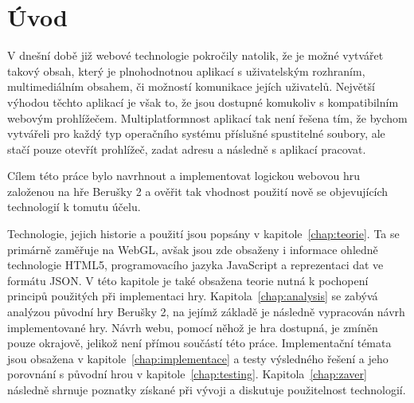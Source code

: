 \chapter{Úvod}
V dnešní době již webové technologie pokročily natolik, že je možné vytvářet takový obsah, který je plnohodnotnou aplikací s uživatelským rozhraním, multimediálním obsahem, či možností komunikace jejích uživatelů. Největší výhodou těchto aplikací je však to, že jsou dostupné komukoliv s kompatibilním webovým prohlížečem. Multiplatformnost aplikací tak není řešena tím, že bychom vytvářeli pro každý typ operačního systému příslušné spustitelné soubory, ale stačí pouze otevřít prohlížeč, zadat adresu a následně s aplikací pracovat. 

Cílem této práce bylo navrhnout a implementovat logickou webovou hru založenou na hře Berušky 2 a ověřit tak vhodnost použití nově se objevujících technologií k tomutu účelu.

Technologie, jejich historie a použití jsou popsány v kapitole~\ref{chap:teorie}. Ta se primárně zaměřuje na WebGL, avšak jsou zde obsaženy i informace ohledně technologie HTML5, programovacího jazyka JavaScript a reprezentaci dat ve formátu JSON. V této kapitole je také obsažena teorie nutná k pochopení principů použitých při implementaci hry. Kapitola~\ref{chap:analysis} se zabývá analýzou původní hry Berušky 2, na jejímž základě je následně vypracován návrh implementované hry. Návrh webu, pomocí něhož je hra dostupná, je zmíněn pouze okrajově, jelikož není přímou součástí této práce. Implementační témata jsou obsažena v kapitole~\ref{chap:implementace} a testy výsledného řešení a jeho porovnání s původní hrou v kapitole~\ref{chap:testing}. Kapitola~\ref{chap:zaver} následně shrnuje poznatky získané při vývoji a diskutuje použitelnost technologií.
